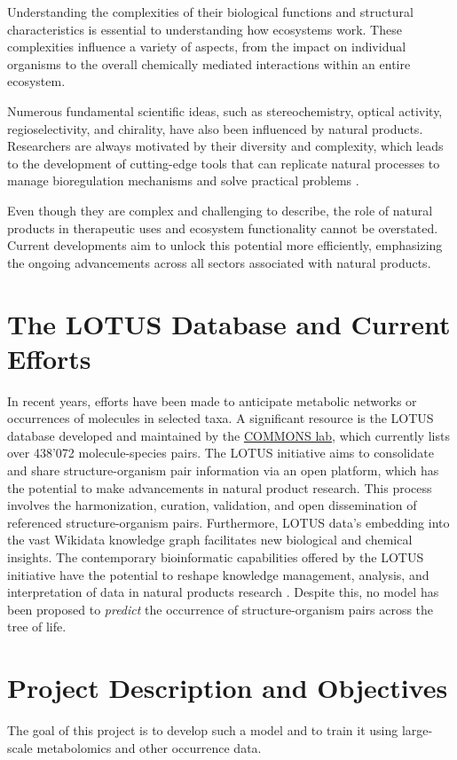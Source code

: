 \documentclass[
11pt, %
oneside, %
english, %
singlespacing, %
headsepline, %
chapterinoneline, %
]{MastersDoctoralThesis} %
\begin{document}
Understanding the complexities of their biological functions and structural characteristics is essential to understanding how ecosystems work. These complexities influence a variety of aspects, from the impact on individual organisms to the overall chemically mediated interactions within an entire ecosystem.

Numerous fundamental scientific ideas, such as stereochemistry, optical activity, regioselectivity, and chirality, have also been influenced by natural products. Researchers are always motivated by their diversity and complexity, which leads to the development of cutting-edge tools that can replicate natural processes to manage bioregulation mechanisms and solve practical problems  \cite{drasarGrowingImportanceNatural2019}.

Even though they are complex and challenging to describe, the role of natural products in therapeutic uses and ecosystem functionality cannot be overstated. Current developments aim to unlock this potential more efficiently, emphasizing the ongoing advancements across all sectors associated with natural products.

\section{The LOTUS Database and Current Efforts}
In recent years, efforts have been made to anticipate metabolic networks or occurrences of molecules in selected taxa. A significant resource is the LOTUS database \cite{rutzLOTUSInitiativeOpen2022} developed and maintained by the \href{https://www.unifr.ch/bio/en/groups/allard/}{COMMONS lab}, which currently lists over 438'072 molecule-species pairs. The LOTUS initiative aims to consolidate and share structure-organism pair information via an open platform, which has the potential to make advancements in natural product research. This process involves the harmonization, curation, validation, and open dissemination of referenced structure-organism pairs. Furthermore, LOTUS data's embedding into the vast Wikidata knowledge graph facilitates new biological and chemical insights. The contemporary bioinformatic capabilities offered by the LOTUS initiative have the potential to reshape knowledge management, analysis, and interpretation of data in natural products research \cite{rutzLOTUSInitiativeOpen2022}. Despite this, no model has been proposed to \textit{predict} the occurrence of structure-organism pairs across the tree of life.

\section{Project Description and Objectives}
The goal of this project is to develop such a model and to train it using large-scale metabolomics and other occurrence data.
\end{document}
